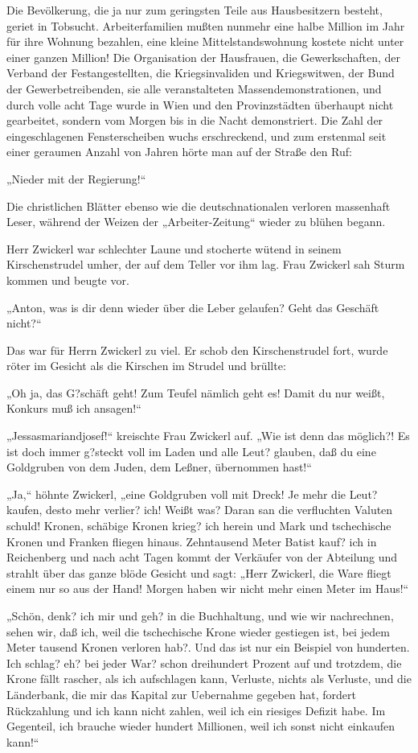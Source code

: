 Die Bevölkerung, die ja nur zum geringsten Teile aus
Hausbesitzern besteht, geriet in Tobsucht. Arbeiterfamilien mußten
nunmehr eine halbe Million im Jahr für ihre Wohnung bezahlen, eine
kleine Mittelstandswohnung kostete nicht unter einer ganzen
Million! Die Organisation der Hausfrauen, die Gewerkschaften, der
Verband der Festangestellten, die Kriegsinvaliden und Kriegswitwen,
der Bund der Gewerbetreibenden, sie alle veranstalteten
Massendemonstrationen, und durch volle acht Tage wurde in Wien und
den Provinzstädten überhaupt nicht gearbeitet, sondern vom Morgen
bis in die Nacht demonstriert. Die Zahl der eingeschlagenen
Fensterscheiben wuchs erschreckend, und zum erstenmal seit einer
geraumen Anzahl von Jahren hörte man auf der Straße den Ruf:

„Nieder mit der Regierung!“

Die christlichen Blätter ebenso wie die deutschnationalen verloren
massenhaft Leser, während der Weizen der „Arbeiter-Zeitung“ wieder
zu blühen begann.

\tb{* * *}
Herr Zwickerl war schlechter Laune und stocherte wütend in seinem
Kirschenstrudel umher, der auf dem Teller vor ihm lag. Frau
Zwickerl sah Sturm kommen und beugte vor.

„Anton, was is dir denn wieder über die Leber gelaufen? Geht das
Geschäft nicht?“

Das war für Herrn Zwickerl zu viel. Er schob den Kirschenstrudel
fort, wurde röter im Gesicht als die Kirschen im Strudel und
brüllte:

„Oh ja, das G?schäft geht! Zum Teufel nämlich geht
es! Damit du nur weißt, Konkurs muß ich ansagen!“

„Jessasmariandjosef!“ kreischte Frau Zwickerl auf. „Wie ist denn
das möglich?! Es ist doch immer g?steckt voll im Laden und alle
Leut? glauben, daß du eine Goldgruben von dem Juden, dem Leßner,
übernommen hast!“

„Ja,“ höhnte Zwickerl, „eine Goldgruben voll mit Dreck! Je mehr die
Leut? kaufen, desto mehr verlier? ich! Weißt was? Daran san die
verfluchten Valuten schuld! Kronen, schäbige Kronen krieg? ich
herein und Mark und tschechische Kronen und Franken fliegen hinaus.
Zehntausend Meter Batist kauf? ich in Reichenberg und nach acht
Tagen kommt der Verkäufer von der Abteilung und strahlt über das
ganze blöde Gesicht und sagt: „Herr Zwickerl, die Ware fliegt einem
nur so aus der Hand! Morgen haben wir nicht mehr einen Meter im
Haus!“

„Schön, denk? ich mir und geh? in die Buchhaltung, und wie wir
nachrechnen, sehen wir, daß ich, weil die tschechische Krone wieder
gestiegen ist, bei jedem Meter tausend Kronen verloren hab?. Und
das ist nur ein Beispiel von hunderten. Ich schlag? eh? bei jeder
War? schon dreihundert Prozent auf und trotzdem, die Krone fällt
rascher, als ich aufschlagen kann, Verluste, nichts als Verluste,
und die Länderbank, die mir das Kapital zur Uebernahme gegeben hat,
fordert Rückzahlung und ich kann nicht zahlen, weil ich ein
riesiges Defizit habe. Im Gegenteil, ich brauche wieder hundert
Millionen, weil ich sonst nicht einkaufen kann!“


